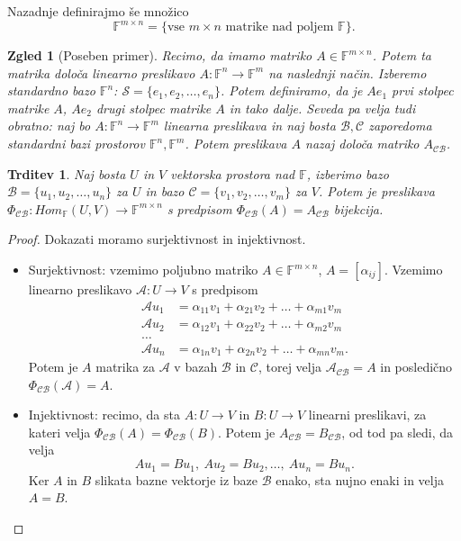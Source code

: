 \documentclass[10pt, a4paper]{article}
\newtheorem{trditev}[izr]{Trditev}
\newtheorem{zgled}{Zgled}[section]
\newenvironment{noticeC}{%
  \tcolorbox[%
  notitle,
  empty,
  enhanced,  %
  breakable,
  coltext=black, 
  fontupper=\rmfamily,
  parbox=false,
  noparskip,
  sharp corners,
  boxrule=-1pt,  %
  frame hidden,
  left=7pt,  %
  right=7pt,
  top=5pt,
  bottom=5pt,
  before skip=2.5ex plus 2pt,
  after skip=2.5ex plus 2pt,
  overlay unbroken and last={%
  },
  ]}
{\endtcolorbox}
\newenvironment{dokaz}%
  {\begin{noticeC}\begin{proof}}%
  {\end{proof}\end{noticeC}}
\newcommand{\F}{\mathbb {F}}
\begin{document}
Nazadnje definirajmo še množico
$$\F^{m \times n} = \{\text{vse $m \times n$ matrike nad poljem $\F$}\}.$$
\begin{zgled}[Poseben primer]
    Recimo, da imamo matriko $A \in \F^{m \times n}$. 
    Potem ta matrika določa linearno preslikavo $A : \F^n \rightarrow \F^m$ na naslednji način.
    Izberemo standardno bazo $\F^n$: $\mathcal{S} = \{e_1, e_2, \dots, e_n\}$.
    Potem definiramo, da je $A e_1$ prvi stolpec matrike $A$, $A e_2$ drugi stolpec matrike $A$ in tako dalje.
    Seveda pa velja tudi obratno: naj bo $A: \F^n \rightarrow \F^m$ linearna preslikava in naj bosta $\mathcal{B}, \mathcal{C}$
    zaporedoma standardni bazi prostorov $\F^n, \F^m$. Potem preslikava $A$ nazaj določa matriko $A_\mathcal{CB}$.
\end{zgled}

\begin{trditev}
    Naj bosta $U$ in $V$ vektorska prostora nad $\F$, izberimo bazo $\mathcal{B} = \{u_1, u_2, \dots, u_n\}$ za $U$ in bazo $\mathcal{C} = \{v_1, v_2, \dots, v_m\}$ za $V$.
    Potem je preslikava $\Phi_{\mathcal{CB}} : Hom_\F (U, V) \rightarrow \F^{m \times n}$
    s predpisom $\Phi_\mathcal{CB} (A) = A_\mathcal{CB}$ bijekcija. 
\end{trditev}

\begin{dokaz}
    Dokazati moramo surjektivnost in injektivnost.
    \begin{itemize}
        \item Surjektivnost: vzemimo poljubno matriko $A \in \F^{m \times n}$,
        $A = [\alpha_{ij}]$. Vzemimo linearno preslikavo $\mathcal{A} : U \rightarrow V$ s predpisom
        \begin{align*}
            \mathcal{A} u_1 &= \alpha_{11} v_1 + \alpha_{21} v_2 + \dots + \alpha_{m1} v_m\\
            \mathcal{A} u_2 &= \alpha_{12} v_1 + \alpha_{22} v_2 + \dots + \alpha_{m2} v_m\\
            \dots\\
            \mathcal{A} u_n &= \alpha_{1n} v_1 + \alpha_{2n} v_2 + \dots + \alpha_{mn} v_m.
        \end{align*}
        Potem je $A$ matrika za $\mathcal{A}$ v bazah $\mathcal{B}$ in $\mathcal{C}$, torej velja $\mathcal{A}_{\mathcal{CB}} = A$ in posledično $\Phi_{\mathcal{CB}} (\mathcal{A}) = A$.
        \item Injektivnost: recimo, da sta $A: U \rightarrow V$ in $B: U \rightarrow V$ linearni preslikavi, za kateri velja $\Phi_{\mathcal{CB}} (A) = \Phi_{\mathcal{CB}} (B)$.
        Potem je $A_{\mathcal{CB}} = B_{\mathcal{CB}}$, od tod pa sledi, da velja
        $$Au_1 = B u_1,\ Au_2 = B u_2, \dots,\ Au_n = B u_n.$$
        Ker $A$ in $B$ slikata bazne vektorje iz baze $\mathcal{B}$ enako, sta nujno enaki in velja $A = B$. \qedhere
    \end{itemize}
\end{dokaz}
\end{document}
